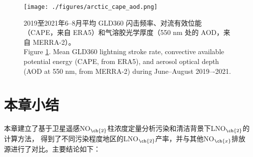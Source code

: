 \begin{figure}[H]
\centering
\texttt{[image: ./figures/arctic\_cape\_aod.png]}
\caption{
2019至2021年6--8月平均 GLD360 闪击频率、对流有效位能（CAPE，来自 ERA5）和气溶胶光学厚度（550 nm 处的 AOD，来自 MERRA-2）。\\
Figure \ref{fig:arctic_cape_aod}.
Mean GLD360 lightning stroke rate, convective available potential energy (CAPE, from ERA5), and aerosol optical depth (AOD at 550 nm, from MERRA-2) during June--August 2019–-2021.
}
\label{fig:arctic_cape_aod}
\end{figure}



\section{本章小结}

本章建立了基于卫星遥感NO$_{\ch{2}}$柱浓度定量分析污染和清洁背景下LNO$_{\ch{2}}$的计算方法，
得到了不同污染程度地区的LNO$_{\ch{2}}$产率，并与其他NO$_{\ch{x}}$排放源进行了对比。主要结论如下：

